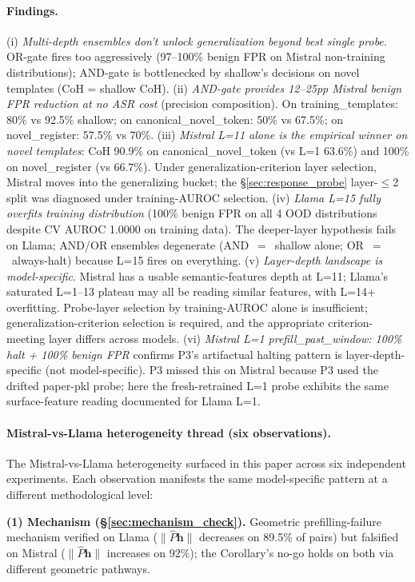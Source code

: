 \documentclass{article}
\begin{document}
\paragraph{Findings.}
(i) \emph{Multi-depth ensembles don't unlock generalization beyond best single probe.} OR-gate fires too aggressively (97--100\% benign FPR on Mistral non-training distributions); AND-gate is bottlenecked by shallow's decisions on novel templates (CoH = shallow CoH).
(ii) \emph{AND-gate provides 12--25pp Mistral benign FPR reduction at no ASR cost} (precision composition). On training\_templates: 80\% vs 92.5\% shallow; on canonical\_novel\_token: 50\% vs 67.5\%; on novel\_register: 57.5\% vs 70\%.
(iii) \emph{Mistral L=11 alone is the empirical winner on novel templates}: CoH 90.9\% on canonical\_novel\_token (vs L=1 63.6\%) and 100\% on novel\_register (vs 66.7\%). Under generalization-criterion layer selection, Mistral moves into the generalizing bucket; the §\ref{sec:response_probe} layer-$\leq$2 split was diagnosed under training-AUROC selection.
(iv) \emph{Llama L=15 fully overfits training distribution} (100\% benign FPR on all 4 OOD distributions despite CV AUROC 1.0000 on training data). The deeper-layer hypothesis fails on Llama; AND/OR ensembles degenerate (AND~$=$~shallow alone; OR~$=$~always-halt) because L=15 fires on everything.
(v) \emph{Layer-depth landscape is model-specific}. Mistral has a usable semantic-features depth at L=11; Llama's saturated L=1--13 plateau may all be reading similar features, with L=14+ overfitting. Probe-layer selection by training-AUROC alone is insufficient; generalization-criterion selection is required, and the appropriate criterion-meeting layer differs across models.
(vi) \emph{Mistral L=1 prefill\_past\_window: 100\% halt + 100\% benign FPR} confirms P3's artifactual halting pattern is layer-depth-specific (not model-specific). P3 missed this on Mistral because P3 used the drifted paper-pkl probe; here the fresh-retrained L=1 probe exhibits the same surface-feature reading documented for Llama L=1.

\paragraph{Mistral-vs-Llama heterogeneity thread (six observations).}
\label{app:heterogeneity_thread}
The Mistral-vs-Llama heterogeneity surfaced in this paper across six independent experiments. Each observation manifests the same model-specific pattern at a different methodological level:

\textbf{(1) Mechanism (\S\ref{sec:mechanism_check}).} Geometric prefilling-failure mechanism verified on Llama ($\|\hat{P}\mathbf{h}\|$ decreases on 89.5\% of pairs) but falsified on Mistral ($\|\hat{P}\mathbf{h}\|$ increases on 92\%); the Corollary's no-go holds on both via different geometric pathways.
\end{document}
